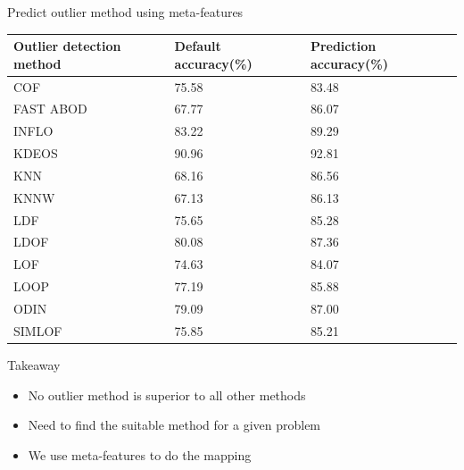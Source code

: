 \documentclass{beamer}
\begin{document}
\begin{darkframes}
\begin{frame}{Predict outlier method using meta-features}
    \begin{table}[!t]
	\centering
	\footnotesize
	\begin{tabular}{p{3.5cm}p{3cm}p{3cm}}
		\toprule
		Outlier detection method & Default accuracy(\%)  & Prediction accuracy(\%)       \\
		\midrule
		COF                      & 75.58      & 83.48                   \\
		FAST ABOD                & 67.77      & 86.07                    \\
		INFLO                    & 83.22      & 89.29                    \\
		KDEOS                    & 90.96      & 92.81                    \\
		KNN                      & 68.16      & 86.56                    \\
		KNNW                     & 67.13      & 86.13                     \\
		LDF                      & 75.65      & 85.28                    \\
		LDOF                     & 80.08      & 87.36                   \\
		LOF                      & 74.63      & 84.07                    \\
		LOOP                     & 77.19      & 85.88                     \\
		ODIN                     & 79.09      & 87.00                    \\
		SIMLOF                   & 75.85      & 85.21                    \\
		\bottomrule
	\end{tabular}
	\label{table:predOutPerf}
\end{table}
\end{frame}

\begin{frame}{Takeaway}
\begin{itemize}
    \item No outlier method is superior to all other methods \\ \vspace{0.5cm}
    \item Need to find the suitable method for a given problem \\ \vspace{0.5cm}
    \item We use meta-features to do the mapping
\end{itemize}
    

\end{frame}
\end{darkframes}
\end{document}
